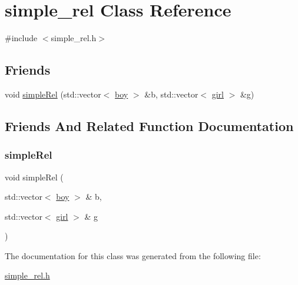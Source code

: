 \hypertarget{classsimple__rel}{}\section{simple\+\_\+rel Class Reference}
\label{classsimple__rel}


{\ttfamily \#include $<$simple\+\_\+rel.\+h$>$}

\subsection*{Friends}
\begin{DoxyCompactItemize}
\item 
void \hyperlink{classsimple__rel_a348a3a38a379963a137a70590688cb30}{simple\+Rel} (std\+::vector$<$ \hyperlink{classboy}{boy} $>$ \&b, std\+::vector$<$ \hyperlink{classgirl}{girl} $>$ \&g)
\end{DoxyCompactItemize}


\subsection{Friends And Related Function Documentation}
\mbox{\label{classsimple__rel_a348a3a38a379963a137a70590688cb30}} 
\subsubsection{\texorpdfstring{simple\+Rel}{simpleRel}}
{\footnotesize\ttfamily void simple\+Rel (\begin{DoxyParamCaption}\item[{std\+::vector$<$ \hyperlink{classboy}{boy} $>$ \&}]{b,  }\item[{std\+::vector$<$ \hyperlink{classgirl}{girl} $>$ \&}]{g }\end{DoxyParamCaption})\hspace{0.3cm}{\ttfamily [friend]}}



The documentation for this class was generated from the following file\+:\begin{DoxyCompactItemize}
\item 
\hyperlink{simple__rel_8h}{simple\+\_\+rel.\+h}\end{DoxyCompactItemize}
